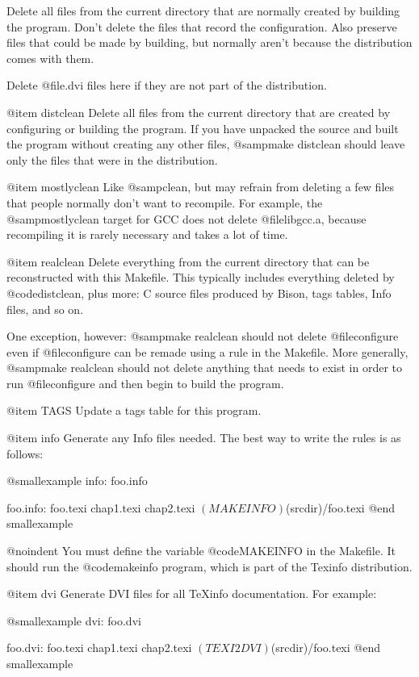 Delete all files from the current directory that are normally created by
building the program.  Don't delete the files that record the
configuration.  Also preserve files that could be made by building, but
normally aren't because the distribution comes with them.

Delete @file{.dvi} files here if they are not part of the distribution.

@item distclean
Delete all files from the current directory that are created by
configuring or building the program.  If you have unpacked the source
and built the program without creating any other files, @samp{make
distclean} should leave only the files that were in the distribution.

@item mostlyclean
Like @samp{clean}, but may refrain from deleting a few files that people
normally don't want to recompile.  For example, the @samp{mostlyclean}
target for GCC does not delete @file{libgcc.a}, because recompiling it
is rarely necessary and takes a lot of time.

@item realclean
Delete everything from the current directory that can be reconstructed
with this Makefile.  This typically includes everything deleted by
@code{distclean}, plus more: C source files produced by Bison, tags tables,
Info files, and so on.

One exception, however: @samp{make realclean} should not delete
@file{configure} even if @file{configure} can be remade using a rule in
the Makefile.  More generally, @samp{make realclean} should not delete
anything that needs to exist in order to run @file{configure}
and then begin to build the program.

@item TAGS
Update a tags table for this program.

@item info
Generate any Info files needed.  The best way to write the rules is as
follows:

@smallexample
info: foo.info

foo.info: foo.texi chap1.texi chap2.texi
        $(MAKEINFO) $(srcdir)/foo.texi
@end smallexample

@noindent
You must define the variable @code{MAKEINFO} in the Makefile.  It should
run the @code{makeinfo} program, which is part of the Texinfo
distribution.

@item dvi
Generate DVI files for all TeXinfo documentation.  
For example:

@smallexample
dvi: foo.dvi

foo.dvi: foo.texi chap1.texi chap2.texi
        $(TEXI2DVI) $(srcdir)/foo.texi
@end smallexample

